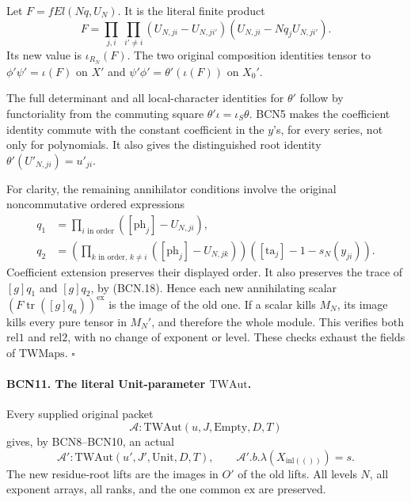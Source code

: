 Let \(F=fEl(Nq,U_N)\).  It is the literal finite product
\[
 F=\prod_{j,i}\ \prod_{i'\ne i}
       (U_{N,ji}-U_{N,ji'})(U_{N,ji}-Nq_j U_{N,ji'}).
                                                               \tag{BCN.26}
\]
Its new value is \(\iota_{R_N}(F)\).
The two original composition identities tensor to
\(\phi'\psi'=\iota(F)\) on \(X'\) and
\(\psi'\phi'=\theta'(\iota(F))\) on \(X_0'\).

The full determinant and all local-character identities
for \(\theta'\) follow by functoriality from the commuting
square \(\theta'\iota=\iota_S\theta\).
BCN5 makes the coefficient identity commute with the
constant coefficient in the \(y\)'s, for every series,
not only for polynomials.  It also gives the distinguished
root identity \(\theta'(U'_{N,ji})=u'_{ji}\).

For clarity, the remaining annihilator conditions involve
the original noncommutative ordered expressions
\[
 \begin{aligned}
 q_1&=\prod_{i\text{ in order}}([\mathrm{ph}_j]-U_{N,ji}),\\
 q_2&=\left(\prod_{k\text{ in order},\,k\ne i}
             ([\mathrm{ph}_j]-U_{N,jk})\right)
             ([\mathrm{ta}_j]-1-s_N(y_{ji})).
 \end{aligned}                                                   \tag{BCN.27}
\]
Coefficient extension preserves their displayed order.
It also preserves the trace of
\([g]q_1\) and \([g]q_2\), by (BCN.18).
Hence each new annihilating scalar
\((F\operatorname{tr}([g]q_a))^{\mathrm{ex}}\)
is the image of the old one.  If a scalar kills \(M_N\),
its image kills every pure tensor in \(M_N'\), and therefore
the whole module.  This verifies both \(\mathrm{rel1}\) and
\(\mathrm{rel2}\), with no change of exponent or level.
These checks exhaust the fields of \(\mathrm{TWMaps}\).
\hfill\(\square\)

\paragraph{BCN11. The literal Unit-parameter \(\mathrm{TWAut}\).}\label{claim:BCN11}
Every supplied original packet
\[
 \mathcal A:\mathrm{TWAut}(u,J,\mathrm{Empty},D,T)
\]
gives, by BCN8--BCN10, an actual
\[
 \mathcal A':
 \mathrm{TWAut}(u',J',\mathrm{Unit},D,T),\qquad
 \mathcal A'.b.\lambda(X_{\mathrm{inl}(())})=s .
                                                               \tag{BCN.28}
\]
The new residue-root lifts are the images in \(O'\) of the
old lifts.  All levels \(N\), all exponent arrays, all ranks,
and the one common \(\mathrm{ex}\) are preserved.

